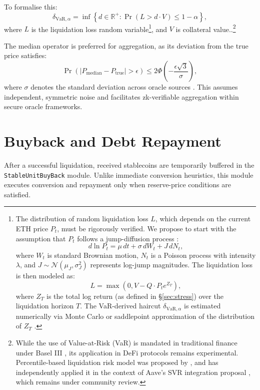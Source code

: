 \documentclass[11pt]{article}
\newcommand{\secref}[1]{\hyperref[#1]{\S\ref*{#1}}}
\begin{document}
\medskip

To formalise this:
\[
\delta_{\text{VaR}, \alpha} = \inf\left\{ d \in \mathbb{R}^+ : \Pr\left(L > d \cdot V\right) \leq 1 - \alpha \right\},
\]
where \( L \) is the liquidation loss random variable\footnote{The distribution of random liquidation loss \(L\), which depends on the current ETH price \(P_t\), must be rigorously verified. We propose to start with the assumption that \(P_t\) follows a jump-diffusion process \parencite{merton1976option}:
\[
d\ln P_t = \mu\, dt + \sigma\, dW_t + J\, dN_t,
\]
where \(W_t\) is standard Brownian motion, \(N_t\) is a Poisson process with intensity \(\lambda\), and \(J \sim \mathcal{N}(\mu_J, \sigma_J^2)\) represents log-jump magnitudes. The liquidation loss is then modeled as:
\[
L = \max\left(0, V - Q \cdot P_t e^{Z_T} \right),
\]
where \(Z_T\) is the total log return  (as defined in \secref{sec:stress}) over the liquidation horizon \(T\). The VaR-derived haircut \(\delta_{\text{VaR}, \alpha}\) is estimated numerically via Monte Carlo or saddlepoint approximation of the distribution of \(Z_T\) \parencite{kou2002jump}.}, and \( V \) is collateral value.\parencite{bcbs_marketrisk_2019}.\footnote{While the use of Value-at-Risk (VaR) is mandated in traditional finance under Basel III \parencite{bcbs_baselIII_2017}, its application in DeFi protocols remains experimental. Percentile-based liquidation risk model was proposed by \textcite{chainlink2025svr}, and \textcite{llamarisk2025svrreview} has independently applied it in the context of Aave's SVR integration proposal , which remains under community review.}

\medskip

The median operator is preferred for aggregation, as its deviation from the true price satisfies:
\[
\Pr\left(\left| P_{\text{median}} - P_{\text{true}} \right| > \epsilon\right) \leq 2\Phi\left(-\frac{\epsilon\sqrt{3}}{\sigma}\right),
\]
where \( \sigma \) denotes the standard deviation across oracle sources \parencite{eskandari2021sok}. This assumes independent, symmetric noise and facilitates zk-verifiable aggregation within secure oracle frameworks.


\section{Buyback and Debt Repayment}
\label{sec:buyback}
After a successful liquidation, received stablecoins are temporarily buffered in the \texttt{StableUnitBuyBack} module.  
Unlike immediate conversion heuristics, this module executes conversion and repayment only when reserve-price conditions are satisfied.
\end{document}
